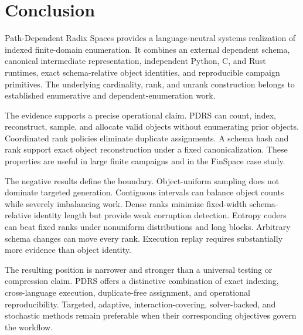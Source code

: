 \section{Conclusion}
Path-Dependent Radix Spaces provides a language-neutral systems realization of indexed finite-domain enumeration. It combines an external dependent schema, canonical intermediate representation, independent Python, C, and Rust runtimes, exact schema-relative object identities, and reproducible campaign primitives. The underlying cardinality, rank, and unrank construction belongs to established enumerative and dependent-enumeration work.

The evidence supports a precise operational claim. PDRS can count, index, reconstruct, sample, and allocate valid objects without enumerating prior objects. Coordinated rank policies eliminate duplicate assignments. A schema hash and rank support exact object reconstruction under a fixed canonicalization. These properties are useful in large finite campaigns and in the FinSpace case study.

The negative results define the boundary. Object-uniform sampling does not dominate targeted generation. Contiguous intervals can balance object counts while severely imbalancing work. Dense ranks minimize fixed-width schema-relative identity length but provide weak corruption detection. Entropy coders can beat fixed ranks under nonuniform distributions and long blocks. Arbitrary schema changes can move every rank. Execution replay requires substantially more evidence than object identity.

The resulting position is narrower and stronger than a universal testing or compression claim. PDRS offers a distinctive combination of exact indexing, cross-language execution, duplicate-free assignment, and operational reproducibility. Targeted, adaptive, interaction-covering, solver-backed, and stochastic methods remain preferable when their corresponding objectives govern the workflow.
